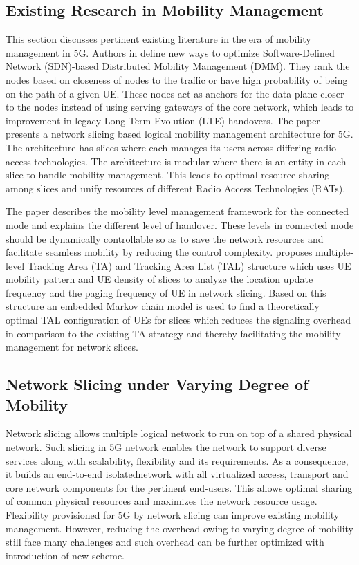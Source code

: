 \begin{multicols}{2}
\subsection{Existing Research in Mobility Management}

This section discusses pertinent existing literature in the era of mobility management in 5G. Authors in \cite{art1-key03} define new ways to optimize Software-Defined Network (SDN)-based Distributed Mobility Management (DMM). They rank the nodes based on closeness of nodes to the traffic or have high probability of being on the path of a given UE. These nodes act as anchors for the data plane closer to the nodes instead of using serving gateways of the core network, which leads to  improvement in legacy Long Term Evolution (LTE) handovers.  The paper \cite{art1-key04} presents a network slicing based logical mobility management architecture for 5G. The architecture has slices where each manages its users across differing radio access technologies. The architecture is modular where there is an entity in each slice to handle mobility management. This leads to optimal resource sharing among slices and unify resources of different Radio Access Technologies (RATs).

The paper \cite{art1-key05} describes the mobility level management framework for the connected mode and explains the different level of handover. These levels in connected mode should be dynamically controllable so as to save the network resources and facilitate seamless mobility by reducing the control complexity.  \cite{art1-key06} proposes multiple-level Tracking Area (TA) and Tracking  Area List (TAL) structure which uses UE mobility pattern  and UE density of slices to analyze the location update  frequency and the paging frequency of UE in network slicing.  Based on this structure an embedded Markov chain model is used to find a theoretically optimal TAL configuration of UEs  for slices which reduces the signaling overhead in comparison  to the existing TA strategy and thereby facilitating the mobility  management for network slices.

\subsection{Network Slicing under Varying Degree of Mobility}

Network slicing allows multiple logical network to run on top of a shared physical network. Such slicing in 5G network enables the network to support diverse services along with scalability, flexibility and its requirements. As a consequence, it builds an end-to-end isolated\break network with all virtualized access, transport and core network components for the pertinent end-users. This allows optimal sharing of common physical resources and maximizes the network resource usage. Flexibility provisioned for 5G by network slicing can improve existing mobility management. However, reducing the overhead owing to varying degree of mobility still face many challenges and such overhead can be further optimized with introduction of new scheme.


\end{multicols}
